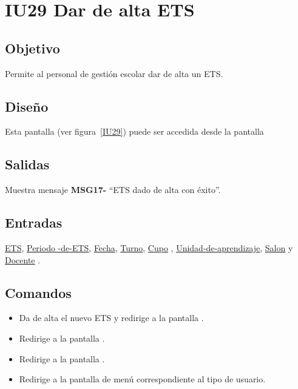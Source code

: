 
\section{IU29 Dar de alta ETS}
\subsection{Objetivo}
    Permite al personal de gestión escolar dar de alta un ETS.
\subsection{Diseño}
    Esta pantalla  (ver figura~\ref{IU29}) puede ser accedida desde la pantalla 

\subsection{Salidas}
Muestra mensaje {\bf MSG17-} ``ETS  dado de alta con éxito''.
\subsection{Entradas}
\hyperlink{ETS.ETS }{ETS},  \hyperlink{ETS.Periodo -de-ETS }{ Periodo -de-ETS},  \hyperlink{ETS.Fecha}{Fecha},  \hyperlink{ETS.Turno}{Turno},  \hyperlink{ETS.Cupo} {Cupo} ,  \hyperlink{ETS.Unidad-de-aprendizaje }{Unidad-de-aprendizaje},  \hyperlink{ETS.Salon}{Salon} y \hyperlink{ETS.Docente}{Docente} .
\subsection{Comandos}
\begin{itemize}
    \item {} Da de alta el nuevo ETS y redirige a la pantalla .
    \item {} Redirige a la pantalla .
    \item {} Redirige a la pantalla .
    \item {} Redirige a la pantalla de menú correspondiente al tipo de usuario.
    
\end{itemize}

